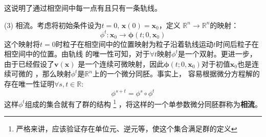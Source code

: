     这说明了通过相空间中每一点有且只有一条轨线。
    \par (3) 相流。考虑将初始条件设为$t=0,\, \bm{x}(0) = \bm{x}_0$，定义
    $\mathbb{R}^n \to \mathbb{R}^n$的映射：
    \begin{equation}
        \phi^{t}: \bm{x}_{0} \to \bm{\phi}(t; 0, \bm{x}_0)
    \end{equation}
    这个映射将$t=0$时粒子在相空间中的位置映射为粒子沿着轨线运动$t$时间后粒子在相空间中的位置。由轨线
    的唯一性可知，对于$\forall t$映射$\phi^t$是一个双射。更进一步，由于已经假设了$\bm{v}(\bm{x})$
    是一个连续可微映射，因此$\bm{\phi}(t; 0, \bm{x}_0)$对于初值$\bm{x}_0$也是连续可微的
    \cite{丁同仁2004常微分方程教程2}，那么映射$\phi^t$是$\mathbb{R}^n$上的一个微分同胚。事实上，
    容易根据微分方程解的存在唯一性证明$\forall s, t\in \mathbb{R}$:
    \begin{equation}
        \phi^{s + t} = \phi^s\circ\phi^{t}
    \end{equation}
    这样$\phi^t$组成的集合就有了群的结构
    \footnote{严格来讲，应该验证存在单位元、逆元等，使这个集合满足群的定义}
    ，将这样的一个单参数微分同胚群称为\textbf{相流}。


